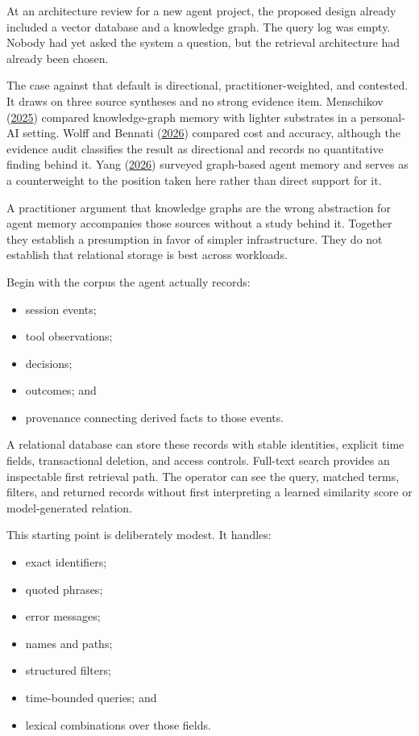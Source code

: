At an architecture review for a new agent project, the proposed design already included a vector database and a knowledge graph. The query log was empty. Nobody had yet asked the system a question, but the retrieval architecture had already been chosen.

The case against that default is directional, practitioner-weighted, and contested. It draws on three source syntheses and no strong evidence item. Menschikov (\href{https://arxiv.org/abs/2506.17001}{2025}) compared knowledge-graph memory with lighter substrates in a personal-AI setting. Wolff and Bennati (\href{https://arxiv.org/abs/2601.07978}{2026}) compared cost and accuracy, although the evidence audit classifies the result as directional and records no quantitative finding behind it. Yang (\href{https://arxiv.org/abs/2602.05665}{2026}) surveyed graph-based agent memory and serves as a counterweight to the position taken here rather than direct support for it.

A practitioner argument that knowledge graphs are the wrong abstraction for agent memory accompanies those sources without a study behind it. Together they establish a presumption in favor of simpler infrastructure. They do not establish that relational storage is best across workloads.


Begin with the corpus the agent actually records:

\begin{itemize}
\tightlist
\item
  session events;
\item
  tool observations;
\item
  decisions;
\item
  outcomes; and
\item
  provenance connecting derived facts to those events.
\end{itemize}

A relational database can store these records with stable identities, explicit time fields, transactional deletion, and access controls. Full-text search provides an inspectable first retrieval path. The operator can see the query, matched terms, filters, and returned records without first interpreting a learned similarity score or model-generated relation.


This starting point is deliberately modest. It handles:

\begin{itemize}
\tightlist
\item
  exact identifiers;
\item
  quoted phrases;
\item
  error messages;
\item
  names and paths;
\item
  structured filters;
\item
  time-bounded queries; and
\item
  lexical combinations over those fields.
\end{itemize}

